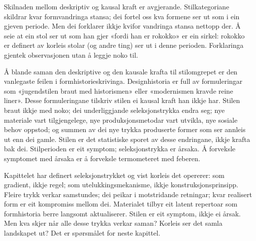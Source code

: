 Skilnaden mellom deskriptiv og kausal kraft er avgjerande. Stilkategoriane skildrar kvar formvandringa stansa; dei fortel oss kva formene ser ut som i ein gjeven periode. Men dei forklarer ikkje kvifor vandringa stansa nettopp der. Å seie at ein stol ser ut som han gjer «fordi han er rokokko» er ein sirkel: rokokko er definert av korleis stolar (og andre ting) ser ut i denne perioden. Forklaringa gjentek observasjonen utan å leggje noko til.

Å blande saman den deskriptive og den kausale krafta til stilomgrepet er den vanlegaste feilen i formhistorieskrivinga. Designhistoria er full av formuleringar som «jugendstilen braut med historismen» eller «modernismen kravde reine liner». Desse formuleringane tilskriv stilen ei kausal kraft han ikkje har. Stilen braut ikkje med noko; dei underliggjande seleksjonstrykka endra seg; nye materiale vart tilgjengelege, nye produksjonsmetodar vart utvikla, nye sosiale behov oppstod; og summen av dei nye trykka produserte former som ser annleis ut enn dei gamle. Stilen er det statistiske sporet av desse endringane, ikkje krafta bak dei. Stilperioden er eit symptom; seleksjonstrykka er årsaka. Å forveksle symptomet med årsaka er å forveksle termometeret med feberen.

\begin{overgang}
Kapittelet har definert seleksjonstrykket og vist korleis det opererer: som gradient, ikkje regel; som utelukkingsmekanisme, ikkje konstruksjonsprinsipp. Fleire trykk verkar samstundes; dei peikar i motstridande retningar; kvar realisert form er eit kompromiss mellom dei. Materialet tilbyr eit latent repertoar som formhistoria berre langsomt aktualiserer. Stilen er eit symptom, ikkje ei årsak. Men kva skjer når alle desse trykka verkar saman? Korleis ser det samla landskapet ut? Det er spørsmålet for neste kapittel.
\end{overgang}
